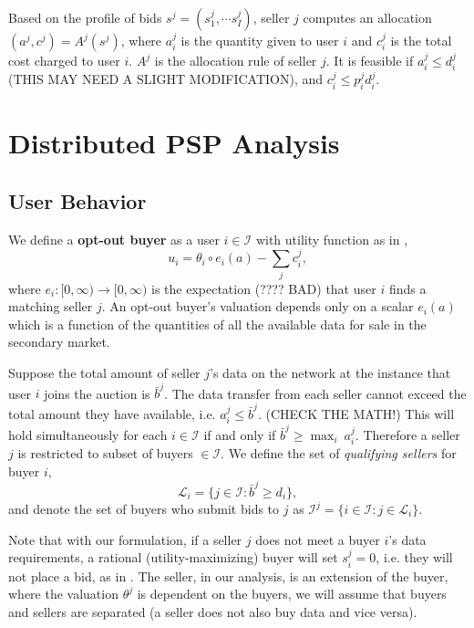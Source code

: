 \documentclass[12pt]{article}
\theoremstyle{definition}
\newcommand{\mcL}{\mathcal{L}}
\newcommand{\mcI}{\mathcal{I}}
\begin{document}
\begin{multicols}{2}
Based on the profile of bids $s^j = (s^j_1, \cdots s^j_I)$, seller $j$ computes
an allocation $(a^j, c^j) = A^j(s^j)$, where $a^j_i$ is the quantity given to
user $i$ and $c^j_i$ is the total cost charged to user $i$. $A^j$ is the
allocation rule of seller $j$. It is feasible if $a^j_i \le d_i^j$ (THIS MAY
NEED A SLIGHT MODIFICATION), and $c^j_i \le  p^j_i d_i^j$.

\section{Distributed PSP Analysis}
\subsection{User Behavior}

We define a \textbf{opt-out buyer} as a user $i\in\mcI$ with utility
function as in \cite{semret},
\begin{equation}\label{opt-utility}
    u_i = \theta_i \circ e_i(a) - \displaystyle\sum_j c_i^j,
\end{equation}
where $e_i : [0, \infty) \rightarrow [0,\infty)$ is the expectation 
(???? BAD) that user
$i$ finds a matching seller $j$. An opt-out buyer's valuation
depends only on a scalar $e_i(a)$ which is a function of the
quantities of all the available data for sale in the secondary market. 

Suppose the total amount of seller $j$'s data on the network at the instance that
user $i$ joins the auction is $\bar{b}^j$. 
The data transfer from each seller cannot exceed the total amount they have available,
i.e. $a_i^j \le \bar{b}^j$. (CHECK THE MATH!) This will hold simultaneously for each $i \in
\mcI$ if and only if $\bar{b}^j \ge \max_i \ a_i^j$. Therefore a seller $j$ is
restricted to subset of buyers $\in\mcI$.
We define the set of \emph{qualifying sellers} for buyer $i$,
\begin{equation}\label{sellers}
     \mcL_i = \lbrace j \in \mcI : \bar{b}^j \ge d_i \rbrace,
\end{equation}
and denote the set of buyers who submit bids to $j$ as $\mcI^j = \lbrace i\in\mcI : j \in
\mcL_i\rbrace.$

Note that with our formulation, if a seller $j$ does not meet a buyer $i$'s data requirements, a
rational (utility-maximizing) buyer will set $s_i^j = 0$, i.e. they will not
place a bid, as in \cite{zheng}. The seller, in our analysis, is an extension of the buyer, where the valuation
$\theta^j$ is dependent on the buyers, we will assume that buyers and sellers
are separated (a seller does not also buy data and vice versa). 


\end{multicols}
\end{document}
